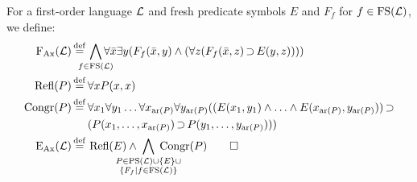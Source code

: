 \begin{defi}
	For a first-order language $\operatorname{\mathcal{L}}$ and fresh predicate symbols $E$ and $F_f$ for $f\in \operatorname{FS}(\operatorname{\mathcal{L}})$, we define:\nopagebreak
	\begin{align*}
		\FAX(\LangSym) \defeq{}& \smashoperator{\bigwedge_{f \in \FS(\LangSym)}}  \forall \bar x \exists y (F_f(\bar x, y) \land (\forall z (F_f(\bar x, z) \limpl E(y, z)))) \\
		\Refl(P) \defeq{}& \forall x P(x,x)  \\ 
		\Congr(P) \defeq{}& 
\forall x_1 \forall y_1 \ldots \forall x_{\ar(P)} \forall y_{\ar(P)} 
(( E(x_1,y_1) \land \ldots \land E(x_{\ar(P)},  y_{\ar(P)})) \limpl  \\
 & (P(x_1, \ldots, x_{\ar(P)}) \limpl P(y_1, \ldots, y_{\ar(P)}) )) \\
		\EAX(\LangSym) \defeq{}& \Refl(E) \land \;\smashoperator{\bigwedge_{\substack{P \in\PS(\LangSym)\cup\{E\}\cup\\ \{F_f\mid f\in \FS(\LangSym)\}}}}\; \Congr(P)
\qedhere
\end{align*}
\end{defi}


